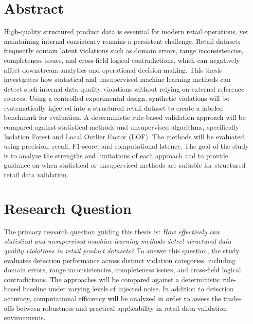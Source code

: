 \documentclass[a4paper, 12pt]{article} %
\begin{document}
\section{Abstract}
High-quality structured product data is essential for modern retail operations, yet maintaining internal consistency remains a persistent challenge. Retail datasets frequently contain latent violations such as domain errors, range inconsistencies, completeness issues, and cross-field logical contradictions, which can negatively affect downstream analytics and operational decision-making.
This thesis investigates how statistical and unsupervised machine learning methods can detect such internal data quality violations without relying on external reference sources. Using a controlled experimental design, synthetic violations will be systematically injected into a structured retail dataset to create a labeled benchmark for evaluation.
A deterministic rule-based validation approach will be compared against statistical methods and unsupervised algorithms, specifically Isolation Forest and Local Outlier Factor (LOF). The methods will be evaluated using precision, recall, F1-score, and computational latency.
The goal of the study is to analyze the strengths and limitations of each approach and to provide guidance on when statistical or unsupervised methods are suitable for structured retail data validation.
\section{Research Question}
The primary research question guiding this thesis is:
\textit{How effectively can statistical and unsupervised machine learning methods detect structured data quality violations in retail product datasets?}
To answer this question, the study evaluates detection performance across distinct violation categories, including domain errors, range inconsistencies, completeness issues, and cross-field logical contradictions. The approaches will be compared against a deterministic rule-based baseline under varying levels of injected noise. In addition to detection accuracy, computational efficiency will be analyzed in order to assess the trade-offs between robustness and practical applicability in retail data validation environments.
\end{document}
